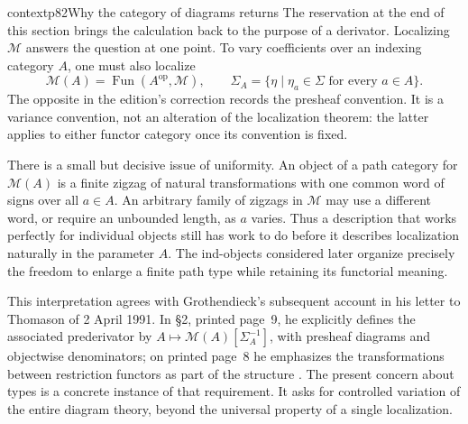 \begin{dcomment}{context}{p82}{Why the category of diagrams returns}
The reservation at the end of this section brings the calculation back to the purpose of a derivator. Localizing $\mathcal M$ answers the question at one point. To vary coefficients over an indexing category $A$, one must also localize
\[
 \mathcal M(A)=\operatorname{Fun}(A^{\mathrm{op}},\mathcal M),
 \qquad
 \Sigma_A=\{\eta\mid\eta_a\in\Sigma\text{ for every }a\in A\}.
\]
The opposite in the edition's correction records the presheaf convention. It is a variance convention, not an alteration of the localization theorem: the latter applies to either functor category once its convention is fixed.

There is a small but decisive issue of uniformity. An object of a path category for $\mathcal M(A)$ is a finite zigzag of natural transformations with one common word of signs over all $a\in A$. An arbitrary family of zigzags in $\mathcal M$ may use a different word, or require an unbounded length, as $a$ varies. Thus a description that works perfectly for individual objects still has work to do before it describes localization naturally in the parameter $A$. The ind-objects considered later organize precisely the freedom to enlarge a finite path type while retaining its functorial meaning.

This interpretation agrees with Grothendieck's subsequent account in his letter to Thomason of 2 April 1991. In \S2, printed page~9, he explicitly defines the associated prederivator by $A\mapsto\mathcal M(A)[\Sigma_A^{-1}]$, with presheaf diagrams and objectwise denominators; on printed page~8 he emphasizes the transformations between restriction functors as part of the structure \citep{Grothendieck1991Letter}. The present concern about types is a concrete instance of that requirement. It asks for controlled variation of the entire diagram theory, beyond the universal property of a single localization.
\end{dcomment}

